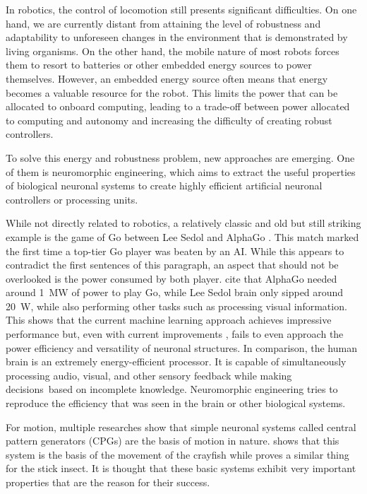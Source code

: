 In robotics, the control of locomotion still presents significant difficulties.
On one hand, we are currently distant from attaining the level of robustness and adaptability to unforeseen changes in the environment that is demonstrated by living organisms. 
On the other hand, the mobile nature of most robots forces them to resort to batteries or other embedded energy sources to power themselves. 
However, an embedded energy source often means that energy becomes a valuable resource for the robot. 
This limits the power that can be allocated to onboard computing, leading to a trade-off between power allocated to computing and autonomy and increasing the difficulty of creating robust controllers. 

To solve this energy and robustness problem, new approaches are emerging. 
One of them is neuromorphic engineering, which aims to extract the useful properties of biological neuronal systems to create highly efficient artificial neuronal controllers or processing units.

While not directly related to robotics, a relatively classic and old but still striking example is the game of Go between Lee Sedol and AlphaGo \citep{alphago1,alphago2,alphago3}. 
This match marked the first time a top-tier Go player was beaten by an AI. While this appears to contradict the first sentences of this paragraph, an aspect that should not be overlooked is the power consumed by both player. 
\citet{alphagoenergy} cite that AlphaGo needed around \qty{1}{\mega\watt} of power to play Go, while Lee Sedol brain only sipped around \qty{20}{\watt}, while also performing other tasks such as processing visual information. 
This shows that the current machine learning approach achieves impressive performance but, even with current improvements \citep{alphagolessenergy}, fails to even approach the power efficiency and versatility of neuronal structures.
In comparison, the human brain is an extremely energy-efficient processor. 
It is capable of simultaneously processing audio, visual, and other sensory feedback while making decisions based on incomplete knowledge. 
Neuromorphic engineering tries to reproduce the efficiency that was seen in the brain or other biological systems.

For motion, multiple researches \citep{crayfish,stickInsect,MARDER} show that simple neuronal systems called central pattern generators (CPGs) are the basis of motion in nature. 
\citet{crayfish} shows that this system is the basis of the movement of the crayfish while \citet{stickInsect} proves a similar thing for the stick insect.
It is thought that these basic systems exhibit very important properties that are the reason for their success.

